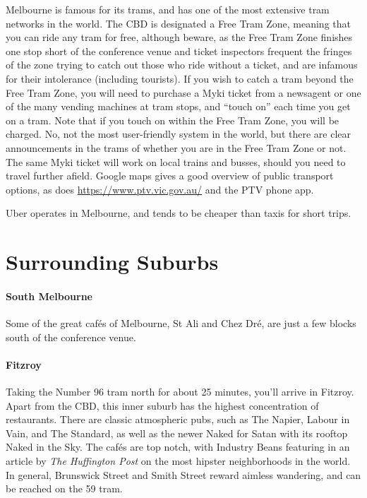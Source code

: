 Melbourne is famous for its trams, and has one of the most extensive
tram networks in the world. The CBD is designated a Free Tram Zone,
meaning that you can ride any tram for free, although beware, as the
Free Tram Zone finishes one stop short of the conference venue and 
ticket inspectors frequent the fringes of the zone trying to catch out
those who ride without a ticket, and are infamous for their intolerance
(including tourists). If you wish to catch a tram beyond the Free Tram
Zone, you will need to purchase a Myki ticket from a newsagent or one of
the many vending machines at tram stops, and ``touch on'' each time you
get on a tram. Note that if you touch on within the Free Tram Zone, you
will be charged. No, not the most user-friendly system in the world, but
there are clear announcements in the trams of whether you are in the
Free Tram Zone or not. The same Myki ticket will work on local trains 
and busses, should you need to travel further afield. Google maps gives
a good overview of public transport options, as does
\url{https://www.ptv.vic.gov.au/} and the PTV phone app.

Uber operates in Melbourne, and tends to be cheaper than taxis for short trips.

\section*{Surrounding Suburbs}
\vspace*{-1em}

\paragraph{South Melbourne}

Some of the great caf{\'e}s of Melbourne, St Ali and Chez Dr{\'e},
are just a few blocks south of the conference venue.

\paragraph{Fitzroy}

Taking the Number 96 tram north for about 25 minutes, you'll arrive in
Fitzroy.
Apart from the CBD, this inner suburb has the highest concentration of
restaurants.
There are classic atmospheric pubs, such as The Napier, Labour in
Vain, and The Standard, as well as the newer Naked for Satan with its 
rooftop
Naked in the Sky.
The caf{\'e}s are top notch, with Industry Beans
featuring in an article by {\em The Huffington Post} on the most hipster
neighborhoods in the world.
In general, Brunswick Street and Smith Street reward aimless wandering,
and can be reached on the 59 tram.


